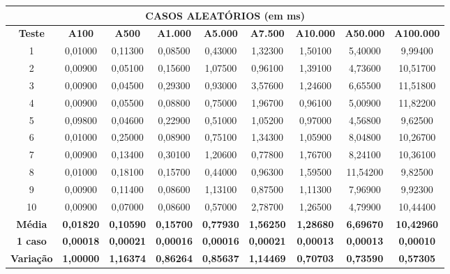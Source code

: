 \documentclass[a4paper, 12pt]{article}
\begin{document}
\begin{tabular}{ccccccccc}

                                                               \multicolumn{ 9}{c}{{\bf CASOS ALEATÓRIOS (em ms)}} \\
\hline
{\bf Teste} & {\bf A100} & {\bf A500} & {\bf A1.000} & {\bf A5.000} & {\bf A7.500} & {\bf A10.000} & {\bf A50.000} & {\bf A100.000} \\
\hline
         1 &    0,01000 &    0,11300 &    0,08500 &    0,43000 &    1,32300 &    1,50100 &    5,40000 &    9,99400 \\
\hline
         2 &    0,00900 &    0,05100 &    0,15600 &    1,07500 &    0,96100 &    1,39100 &    4,73600 &   10,51700 \\
\hline
         3 &    0,00900 &    0,04500 &    0,29300 &    0,93000 &    3,57600 &    1,24600 &    6,65500 &   11,51800 \\
\hline
         4 &    0,00900 &    0,05500 &    0,08800 &    0,75000 &    1,96700 &    0,96100 &    5,00900 &   11,82200 \\
\hline
         5 &    0,09800 &    0,04600 &    0,22900 &    0,51000 &    1,05200 &    0,97000 &    4,56800 &    9,62500 \\
\hline
         6 &    0,01000 &    0,25000 &    0,08900 &    0,75100 &    1,34300 &    1,05900 &    8,04800 &   10,26700 \\
\hline
         7 &    0,00900 &    0,13400 &    0,30100 &    1,20600 &    0,77800 &    1,76700 &    8,24100 &   10,36100 \\
\hline
         8 &    0,01000 &    0,18100 &    0,15700 &    0,44000 &    0,96300 &    1,59500 &   11,54200 &    9,82500 \\
\hline
         9 &    0,00900 &    0,11400 &    0,08600 &    1,13100 &    0,87500 &    1,11300 &    7,96900 &    9,92300 \\
\hline
        10 &    0,00900 &    0,07000 &    0,08600 &    0,57000 &    2,78700 &    1,26500 &    4,79900 &   10,44400 \\
\hline
{\bf Média} & {\bf 0,01820} & {\bf 0,10590} & {\bf 0,15700} & {\bf 0,77930} & {\bf 1,56250} & {\bf 1,28680} & {\bf 6,69670} & {\bf 10,42960} \\
\hline
{\bf 1 caso} & {\bf 0,00018} & {\bf 0,00021} & {\bf 0,00016} & {\bf 0,00016} & {\bf 0,00021} & {\bf 0,00013} & {\bf 0,00013} & {\bf 0,00010} \\
\hline
{\bf Variação} & {\bf 1,00000} & {\bf 1,16374} & {\bf 0,86264} & {\bf 0,85637} & {\bf 1,14469} & {\bf 0,70703} & {\bf 0,73590} & {\bf 0,57305} \\
\hline
\end{tabular}  
\vspace{0.3cm}
\end{document}
